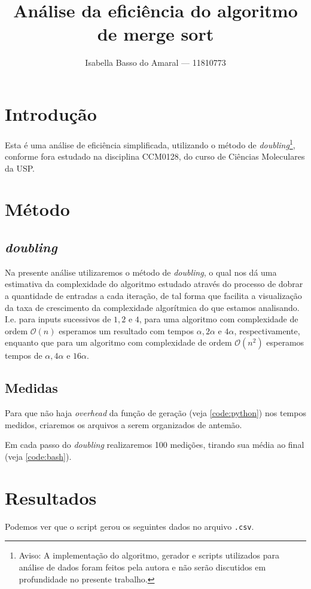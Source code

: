 \documentclass[12pt,reqno]{amsart}
\title[]{Análise da eficiência do algoritmo de merge sort}
\author{Isabella Basso do Amaral --- 11810773}
\begin{document}
\maketitle
\thispagestyle{empty}




\section{Introdução}
Esta é uma análise de eficiência simplificada, utilizando o método
de \textit{doubling}\footnote{Aviso:
A implementação do algoritmo, gerador e scripts utilizados para análise
de dados foram feitos pela autora e não serão discutidos em profundidade
no presente trabalho.
}, conforme fora estudado na disciplina CCM0128, do curso de Ciências
Moleculares da USP.

\section{Método}
\subsection{\textit{doubling}}
Na presente análise utilizaremos o método de \textit{doubling}, o qual
nos dá uma estimativa da complexidade
do algoritmo estudado através do processo de dobrar a quantidade de
entradas a cada iteração, de tal forma que facilita a visualização
da taxa de crescimento da complexidade algorítmica do que estamos
analisando. I.e. para inputs sucessivos de $1, 2$ e $4$, para uma
algoritmo com complexidade de ordem $\mathcal{O}(n)$ esperamos
um resultado com tempos $\alpha, 2\alpha$ e $4\alpha$, respectivamente,
enquanto que para um algoritmo com complexidade de ordem $\mathcal{O}(n^2)$
esperamos tempos de $\alpha, 4\alpha$ e $16\alpha$.

\subsection{Medidas}
Para que não haja \textit{overhead} da função de geração (veja \ref{code:python})
nos tempos medidos, criaremos os arquivos a serem organizados de antemão.

Em cada passo do \textit{doubling} realizaremos 100 medições, tirando sua
média ao final (veja \ref{code:bash}).

\section{Resultados}
Podemos ver que o script gerou os seguintes dados no arquivo \texttt{.csv}.
\end{document}

